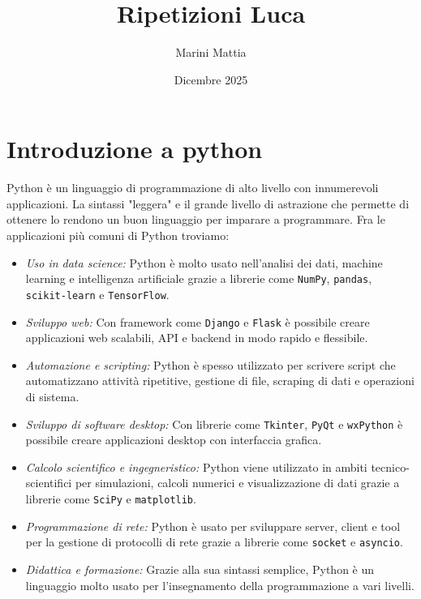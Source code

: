 
\title{Ripetizioni Luca}
\author{Marini Mattia}
\date{Dicembre 2025}


\maketitle
{}
\tableofcontents
\newpage
\section{Introduzione a python}
Python è un linguaggio di programmazione di alto livello con innumerevoli applicazioni. La sintassi "leggera" e il grande livello di astrazione che permette di ottenere lo rendono un buon linguaggio per imparare a programmare.
\vskip3mm
Fra le applicazioni più comuni di Python troviamo:
\begin{itemize}
	\item \textit{Uso in data science:}
	      Python è molto usato nell'analisi dei dati, machine learning e intelligenza artificiale grazie a librerie come \texttt{NumPy}, \texttt{pandas}, \texttt{scikit-learn} e \texttt{TensorFlow}.
	\item \textit{Sviluppo web:}
	      Con framework come \texttt{Django} e \texttt{Flask} è possibile creare applicazioni web scalabili, API e backend in modo rapido e flessibile.
	\item \textit{Automazione e scripting:}
	      Python è spesso utilizzato per scrivere script che automatizzano attività ripetitive, gestione di file, scraping di dati e operazioni di sistema.
	\item \textit{Sviluppo di software desktop:}
	      Con librerie come \texttt{Tkinter}, \texttt{PyQt} e \texttt{wxPython} è possibile creare applicazioni desktop con interfaccia grafica.
	\item \textit{Calcolo scientifico e ingegneristico:}
	      Python viene utilizzato in ambiti tecnico-scientifici per simulazioni, calcoli numerici e visualizzazione di dati grazie a librerie come \texttt{SciPy} e \texttt{matplotlib}.
	\item \textit{Programmazione di rete:}
	      Python è usato per sviluppare server, client e tool per la gestione di protocolli di rete grazie a librerie come \texttt{socket} e \texttt{asyncio}.
	\item \textit{Didattica e formazione:}
	      Grazie alla sua sintassi semplice, Python è un linguaggio molto usato per l'insegnamento della programmazione a vari livelli.
\end{itemize}
